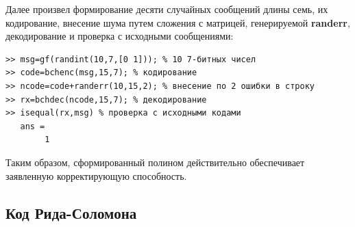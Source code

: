 \documentclass[12pt,a4paper]{article}
\begin{document}
  Далее произвел формирование десяти случайных сообщений длины семь, их кодирование, внесение шума путем сложения с матрицей, генерируемой \textbf{randerr}, декодирование и проверка с исходными сообщениями:
  \begin{lstlisting}
>> msg=gf(randint(10,7,[0 1])); % 10 7-битных чисел
>> code=bchenc(msg,15,7); % кодирование
>> ncode=code+randerr(10,15,2); % внесение по 2 ошибки в строку
>> rx=bchdec(ncode,15,7); % декодирование
>> isequal(rx,msg) % проверка с исходными кодами
   ans =
        1
  \end{lstlisting}
  Таким образом, сформированный полином действительно обеспечивает заявленную корректирующую способность.
  

\subsection{Код Рида-Соломона}
\end{document}
